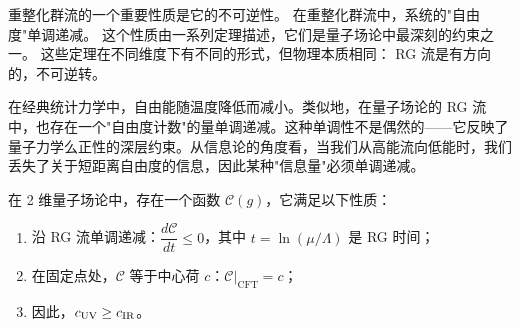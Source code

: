 重整化群流的一个重要性质是它的不可逆性。
在重整化群流中，系统的"自由度"单调递减。
这个性质由一系列定理描述，它们是量子场论中最深刻的约束之一。
这些定理在不同维度下有不同的形式，但物理本质相同：
RG 流是有方向的，不可逆转。

\begin{note}[物理动机]
在经典统计力学中，自由能随温度降低而减小。类似地，在量子场论的 RG 流中，也存在一个"自由度计数"的量单调递减。这种单调性不是偶然的——它反映了量子力学么正性的深层约束。从信息论的角度看，当我们从高能流向低能时，我们丢失了关于短距离自由度的信息，因此某种"信息量"必须单调递减。
\end{note}

\begin{theorem}\label{thm:c-theorem}
在 2 维量子场论中，存在一个函数 $\mathcal{C}(g)$，它满足以下性质：
\begin{enumerate}
    \item 沿 RG 流单调递减：$\dfrac{d\mathcal{C}}{dt} \leq 0$，其中 $t = \ln(\mu/\Lambda)$ 是 RG 时间；
    \item 在固定点处，$\mathcal{C}$ 等于中心荷 $c$：$\mathcal{C}\big|_{\text{CFT}} = c$；
    \item 因此，$c_{\rm UV} \geq c_{\rm IR}$。
\end{enumerate}
\end{theorem}

